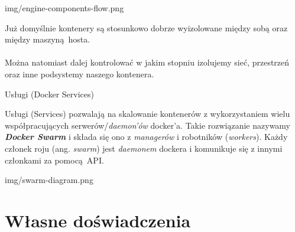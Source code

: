 \documentclass[aspectratio=169]{beamer}
\begin{document}
\begin{frameImg}[\textwidth]{img/engine-components-flow.png}
\end{frameImg}

\begin{frame}
    \begin{card}
        Już domyślnie kontenery są stosunkowo dobrze wyizolowane między sobą oraz między maszyną hosta.\\\\
        Można natomiast dalej kontrolować w jakim stopniu izolujemy sieć, przestrzeń oraz inne podsystemy naszego kontenera.
    \end{card}
\end{frame}

\begin{frame}{Usługi (Docker Services)}
    \begin{card}
        Usługi (Services) pozwalają na skalowanie kontenerów z wykorzystaniem wielu współpracujących serwerów/\textit{daemon'ów} docker'a.
        Takie rozwiązanie nazywamy \textbf{\textit{Docker Swarm}} i składa się ono z \textit{managerów} i robotników (\textit{workers}).
        Każdy członek roju (ang. \textit{swarm}) jest \textit{daemonem} dockera i komunikuje się z innymi członkami za pomocą API.
    \end{card}
\end{frame}

\begin{frameImg}[\textwidth]{img/swarm-diagram.png}
\end{frameImg}

\section{Własne doświadczenia}
\end{document}
